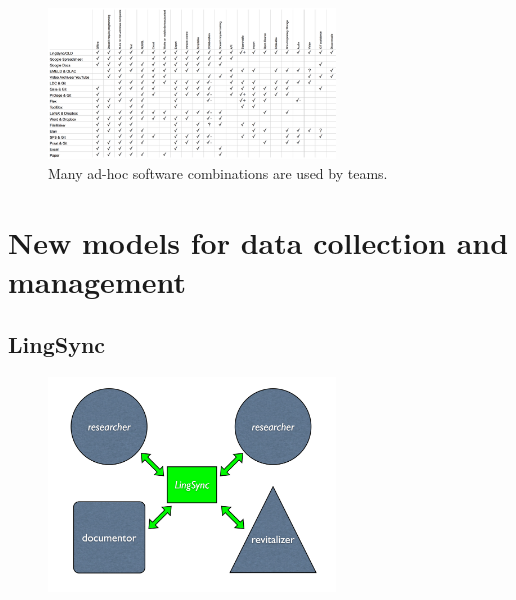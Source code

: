 \documentclass{beamer}
\begin{document}
\begin{frame}
\begin{figure}
\begin{center}
\includegraphics[width=3in]{../figures/other_software}
\caption{Many ad-hoc software combinations are used by teams.}
\label{allothersoftware}
\end{center}
\end{figure}
\end{frame}


\section[LingSync/OLD]{New models for data collection and management}
\subsection{LingSync}\label{sec:lingsync}


\begin{frame}
\begin{figure}
\begin{center}
\includegraphics[width=3in]{../figures/bridge_stakeholders}
\label{lingsync:bridge}
\end{center}
\end{figure}
\end{frame}
\end{document}
